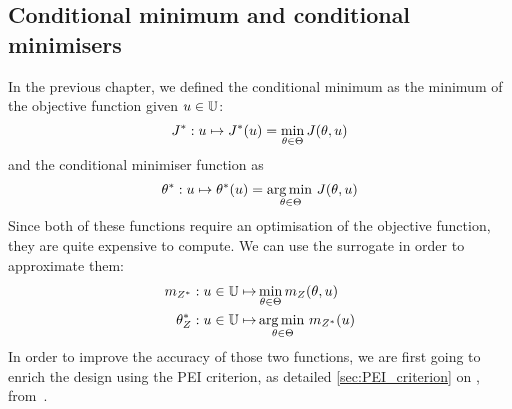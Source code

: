 \documentclass[../../Main_ManuscritThese.tex]{subfiles}
\begin{document}
\subsection{Conditional minimum and conditional minimisers}
\label{ssec:croco_cond_minimum_minimisers}
In the previous chapter, we defined the conditional minimum as the
minimum of the objective function given $u\in \mathbb{U}$:
\begin{equation}
  J^* : u \mapsto J^*(u) = \min_{\theta\in\Theta} J(\theta, u)
\end{equation}
and the conditional minimiser function as
\begin{equation}
  \theta^*:u  \mapsto \theta^*(u) = \operatorname*{arg\,min \,}_{\theta \in \Theta} J(\theta, u)
\end{equation}
Since both of these functions require an optimisation of the objective
function, they are quite expensive to compute. We can use the
surrogate in order to approximate them:
\begin{align}
  m_{Z^*}: u\in\mathbb{U} \mapsto &\min_{\theta \in \Theta} m_Z(\theta, u) \\
  \theta^*_{Z}: u \in \mathbb{U} \mapsto &\operatorname*{arg\,min \,}_{\theta \in \Theta} m_{Z^*}(u)
\end{align}
In order to improve the accuracy of those two functions, we are first
going to enrich the design using the PEI criterion, as detailed
\cref{sec:PEI_criterion} on ,
from~\cite{ginsbourger_bayesian_2014}.
\end{document}
